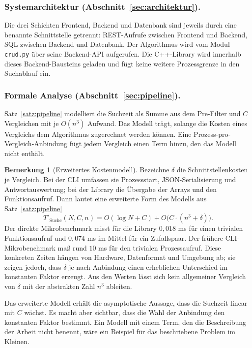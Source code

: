 \documentclass[a4paper,12pt, twoside]{report}
\theoremstyle{definition}
\newtheorem{bemerkung}{Bemerkung}
\begin{document}
\subsubsection{Systemarchitektur (Abschnitt~\ref{sec:architektur}).} Die drei Schichten Frontend, Backend und Datenbank sind jeweils durch eine benannte Schnittstelle getrennt: REST-Aufrufe zwischen Frontend und Backend, SQL zwischen Backend und Datenbank. Der Algorithmus wird vom Modul \texttt{crud.py} über seine Backend-API aufgerufen. Die C++-Library wird innerhalb dieses Backend-Bausteins geladen und fügt keine weitere Prozessgrenze in den Suchablauf ein.

\subsubsection{Formale Analyse (Abschnitt~\ref{sec:pipeline}).} Satz~\ref{satz:pipeline} modelliert die Suchzeit als Summe aus dem Pre-Filter und $C$ Vergleichen mit je $O(n^3)$ Aufwand. Das Modell trägt, solange die Kosten eines Vergleichs dem Algorithmus zugerechnet werden können. Eine Prozess-pro-Vergleich-Anbindung fügt jedem Vergleich einen Term hinzu, den das Modell nicht enthält.

\begin{bemerkung}[Erweitertes Kostenmodell]
\label{bem:schnittstellenkosten}
Bezeichne $\delta$ die Schnittstellenkosten je Vergleich. Bei der CLI umfassen sie Prozessstart, JSON-Serialisierung und Antwortauswertung; bei der Library die Übergabe der Arrays und den Funktionsaufruf. Dann lautet eine erweiterte Form des Modells aus Satz~\ref{satz:pipeline}
\[
	T'_{\text{Suche}}(N,C,n) = O(\log N + C) + O\bigl(C\cdot(n^3+\delta)\bigr).
\]
Der direkte Mikrobenchmark misst für die Library $0{,}018$ ms für einen trivialen Funktionsaufruf und $0{,}074$ ms im Mittel für ein Zufallspaar. Der frühere CLI-Mikrobenchmark maß rund $10$ ms für den trivialen Prozessaufruf. Diese konkreten Zeiten hängen von Hardware, Datenformat und Umgebung ab; sie zeigen jedoch, dass $\delta$ je nach Anbindung einen erheblichen Unterschied im konstanten Faktor erzeugt. Aus den Werten lässt sich kein allgemeiner Vergleich von $\delta$ mit der abstrakten Zahl $n^3$ ableiten.
\end{bemerkung}

Das erweiterte Modell erhält die asymptotische Aussage, dass die Suchzeit linear mit $C$ wächst. Es macht aber sichtbar, dass die Wahl der Anbindung den konstanten Faktor bestimmt. Ein Modell mit einem Term, den die Beschreibung der Arbeit nicht benennt, wäre ein Beispiel für das beschriebene Problem im Kleinen.
\end{document}
